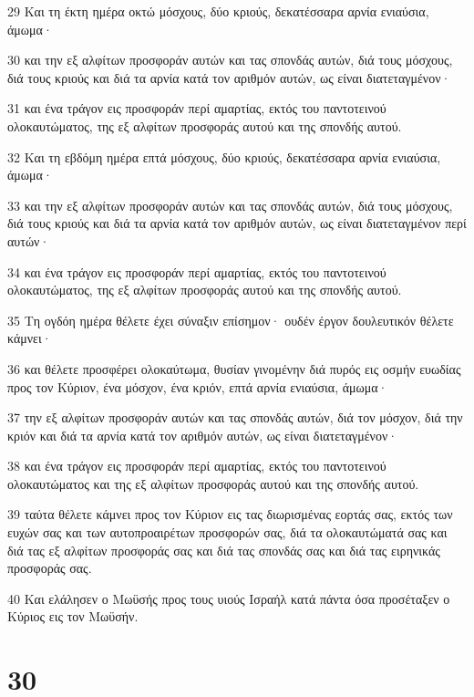 \par 29 Και τη έκτη ημέρα οκτώ μόσχους, δύο κριούς, δεκατέσσαρα αρνία ενιαύσια, άμωμα·
\par 30 και την εξ αλφίτων προσφοράν αυτών και τας σπονδάς αυτών, διά τους μόσχους, διά τους κριούς και διά τα αρνία κατά τον αριθμόν αυτών, ως είναι διατεταγμένον·
\par 31 και ένα τράγον εις προσφοράν περί αμαρτίας, εκτός του παντοτεινού ολοκαυτώματος, της εξ αλφίτων προσφοράς αυτού και της σπονδής αυτού.
\par 32 Και τη εβδόμη ημέρα επτά μόσχους, δύο κριούς, δεκατέσσαρα αρνία ενιαύσια, άμωμα·
\par 33 και την εξ αλφίτων προσφοράν αυτών και τας σπονδάς αυτών, διά τους μόσχους, διά τους κριούς και διά τα αρνία κατά τον αριθμόν αυτών, ως είναι διατεταγμένον περί αυτών·
\par 34 και ένα τράγον εις προσφοράν περί αμαρτίας, εκτός του παντοτεινού ολοκαυτώματος, της εξ αλφίτων προσφοράς αυτού και της σπονδής αυτού.
\par 35 Τη ογδόη ημέρα θέλετε έχει σύναξιν επίσημον· ουδέν έργον δουλευτικόν θέλετε κάμνει·
\par 36 και θέλετε προσφέρει ολοκαύτωμα, θυσίαν γινομένην διά πυρός εις οσμήν ευωδίας προς τον Κύριον, ένα μόσχον, ένα κριόν, επτά αρνία ενιαύσια, άμωμα·
\par 37 την εξ αλφίτων προσφοράν αυτών και τας σπονδάς αυτών, διά τον μόσχον, διά την κριόν και διά τα αρνία κατά τον αριθμόν αυτών, ως είναι διατεταγμένον·
\par 38 και ένα τράγον εις προσφοράν περί αμαρτίας, εκτός του παντοτεινού ολοκαυτώματος και της εξ αλφίτων προσφοράς αυτού και της σπονδής αυτού.
\par 39 ταύτα θέλετε κάμνει προς τον Κύριον εις τας διωρισμένας εορτάς σας, εκτός των ευχών σας και των αυτοπροαιρέτων προσφορών σας, διά τα ολοκαυτώματά σας και διά τας εξ αλφίτων προσφοράς σας και διά τας σπονδάς σας και διά τας ειρηνικάς προσφοράς σας.
\par 40 Και ελάλησεν ο Μωϋσής προς τους υιούς Ισραήλ κατά πάντα όσα προσέταξεν ο Κύριος εις τον Μωϋσήν.

\chapter{30}

